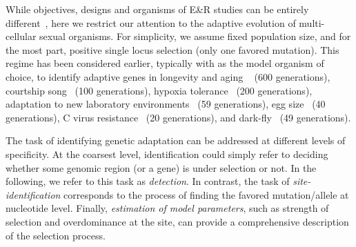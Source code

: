 While objectives, designs and organisms of E\&R studies can be entirely
different~\cite{Barrick2013Genome,schlotterer2015combining}, here we
restrict our attention to the adaptive evolution of multi-cellular
sexual organisms.  For simplicity, we assume fixed population size,
and for the most part, positive single locus selection (only one
favored mutation). This regime has been considered earlier, typically
with \dmel as the model organism of choice, to identify adaptive genes
in longevity and aging ~\cite{burke2010genome,remolina2012genomic}
(600 generations), courtship song~\cite{turner2011population} (100
generations), hypoxia tolerance~\cite{zhou2011experimental} (200
generations), adaptation to new laboratory
environments~\cite{orozco2012adaptation,franssen2015patterns} (59
generations), egg size~\cite{jha2015whole} (40 generations), C virus
resistance~\cite{martins2014host} (20 generations), and
dark-fly~\cite{izutsu2015dynamics} (49 generations).


The task of identifying genetic adaptation can be addressed at
different levels of specificity. At the coarsest level, identification
could simply refer to deciding whether some genomic region (or a gene)
is under selection or not. In the following, we refer to this task as
\emph{detection}. In contrast, the task of \emph{site-identification}
corresponds to the process of finding the favored mutation/allele at
nucleotide level. Finally, \emph{estimation of model parameters}, such
as strength of selection and overdominance at the site, can provide a
comprehensive description of the selection process.

